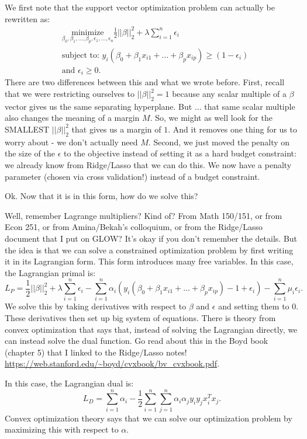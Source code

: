 We first note that the support vector optimization problem can actually be rewritten as:
\begin{align*}
&\underset{{\beta_0, \beta_1, \ldots, \beta_p, \epsilon_1,\ldots, \epsilon_n}}{\mathrm{minimize}} \frac{1}{2}||\beta||_2^2 + \lambda \sum_{i=1}^n \epsilon_i \\
&\text{subject to:  } y_i (\beta_0 + \beta_1 x_{i1} + \ldots + \beta_p x_{ip} ) \geq (1-\epsilon_i) \\ 
&\text{and } \epsilon_i \geq 0.
\end{align*} 
There are two differences between this and what we wrote before. First, recall that we were restricting ourselves to $||\beta||_2^2=1$ because any scalar multiple of a $\beta$ vector gives us the same separating hyperplane. But ... that same scalar multiple also changes the meaning of a margin $M$. So, we might as well look for the SMALLEST $||\beta||_2^2$ that gives us a margin of $1$. And it removes one thing for us to worry about - we don't actually need $M$. Second, we just moved the penalty on the size of the $\epsilon$ to the objective instead of setting it as a hard budget constraint: we already know from Ridge/Lasso that we can do this. We now have a penalty parameter (chosen via cross validation!) instead of a budget constraint. 

Ok. Now that it is in this form, how do we solve this?

Well, remember Lagrange multipliers? Kind of? From Math 150/151, or from Econ 251, or from Amina/Bekah's colloquium, or from the Ridge/Lasso document that I put on GLOW? It's okay if you don't remember the details. But the idea is that we can solve a constrained optimization problem by first writing it in its Lagrangian form. This form introduces many free variables. In this case, the Lagrangian primal is:
$$
L_P = \frac{1}{2} ||\beta||_2^2 + \lambda \sum_{i=1}^n \epsilon_i - \sum_{i=1}^n \alpha_i \left( y_i (\beta_0 + \beta_1 x_{i1} + \ldots + \beta_p x_{ip}) - 1 + \epsilon_i \right) - \sum_{i=1}^n \mu_i \epsilon_i. 
$$
We solve this by taking derivatives with respect to $\beta$ and $\epsilon$ and setting them to $0$. These derivatives then set up big system of equations. There is theory from convex optimization that says that, instead of solving the Lagrangian directly, we can instead solve the dual function. Go read about this in the Boyd book (chapter 5) that I linked to the Ridge/Lasso notes! \url{https://web.stanford.edu/~boyd/cvxbook/bv_cvxbook.pdf}. 

In this case, the Lagrangian dual is:
$$
L_D = \sum_{i=1}^n \alpha_i - \frac{1}{2} \sum_{i=1}^n \sum_{j=1}^n \alpha_i \alpha_j y_i y_j x_i^T x_j.
$$
Convex optimization theory says that we can solve our optimization problem by maximizing this with respect to $\alpha$. 

